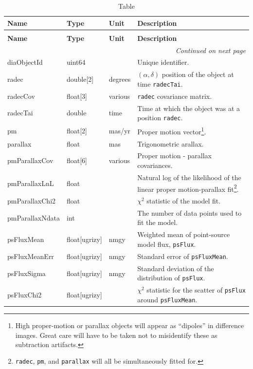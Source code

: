 \documentclass[SE,lsstdraft,toc]{lsstdoc}
\newenvironment{schema}[3]{%
\setlength\LTleft{0pt}
\setlength\LTright{\fill}
\begin{longtable}{p{0.2\textwidth}p{0.14\textwidth}p{0.14\textwidth}p{0.41\textwidth}}

\caption[#1]{#2\label{#3}}\\

\hline \textbf{Name} & \textbf{Type} & \textbf{Unit} & \textbf{Description}\\ \hline
\endfirsthead

\caption[#1]{#2}\\

\hline \textbf{Name} & \textbf{Type} & \textbf{Unit} & \textbf{Description}\\ \hline
\endhead

\hline \multicolumn{4}{r}{\emph{Continued on next page}} \\
\endfoot

\hline\hline
\endlastfoot
}{%
\hline
\end{longtable}
}
\begin{document}
\begin{schema}{\DIAObject Table}{\DIAObject Table}{tbl:diaobjectTable}

diaObjectId & uint64 & ~ & Unique identifier. \\

radec & double[2] & degrees & $(\alpha, \delta)$ position of the object at time \texttt{radecTai}. \\

radecCov & float[3] & various & \texttt{radec} covariance matrix. \\

radecTai & double & time & Time at which the object was at a position \texttt{radec}. \\

pm & float[2] & mas/yr & Proper motion vector\footnote{High proper-motion or parallax objects will appear as ``dipoles'' in difference images. Great care will have to be taken not to misidentify these as subtraction artifacts.}. \\

parallax & float & mas & Trigonometric arallax. \\

pmParallaxCov & float[6] & various & Proper motion - parallax covariances. \\

pmParallaxLnL & float & ~ & Natural log of the likelihood of the linear proper motion-parallax fit\footnote{\texttt{radec}, \texttt{pm}, and \texttt{parallax} will all be simultaneously fitted for.}. \\

pmParallaxChi2 & float & ~ & $\chi^2$ statistic of the model fit. \\

pmParallaxNdata & int & ~ & The number of data points used to fit the model. \\

psFluxMean & float[ugrizy] & nmgy & Weighted mean of point-source model flux, \texttt{psFlux}. \\

psFluxMeanErr & float[ugrizy] & nmgy & Standard error of \texttt{psFluxMean}.  \\

psFluxSigma & float[ugrizy] & nmgy & Standard deviation of the distribution of \texttt{psFlux}. \\

psFluxChi2 & float[ugrizy] & ~ & $\chi^2$ statistic for the scatter of \texttt{psFlux} around \texttt{psFluxMean}. \\


\end{schema}
\end{document}
